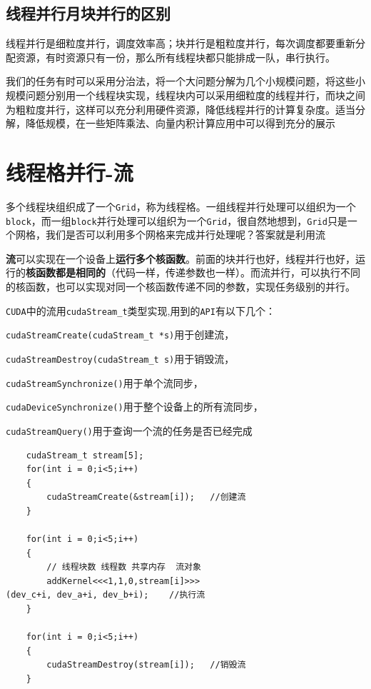 \documentclass[UTF8,a4paper,12pt]{ctexbook}
\begin{document}
		\subsection{线程并行月块并行的区别}
			线程并行是细粒度并行，调度效率高；块并行是粗粒度并行，每次调度都要重新分配资源，有时资源只有一份，那么所有线程块都只能排成一队，串行执行。 
			
			我们的任务有时可以采用分治法，将一个大问题分解为几个小规模问题，将这些小规模问题分别用一个线程块实现，线程块内可以采用细粒度的线程并行，而块之间为粗粒度并行，这样可以充分利用硬件资源，降低线程并行的计算复杂度。适当分解，降低规模，在一些矩阵乘法、向量内积计算应用中可以得到充分的展示
		  
	\section{线程格并行-流}
		多个线程块组织成了一个\verb|Grid|，称为线程格。一组线程并行处理可以组织为一个\verb|block|，而一组\verb|block|并行处理可以组织为一个\verb|Grid|，很自然地想到，\verb|Grid|只是一个网格，我们是否可以利用多个网格来完成并行处理呢？答案就是利用流
	
		\textbf{流}可以实现在一个设备上\textbf{运行多个核函数}。前面的块并行也好，线程并行也好，运行的\textbf{核函数都是相同的}（代码一样，传递参数也一样）。而流并行，可以执行不同的核函数，也可以实现对同一个核函数传递不同的参数，实现任务级别的并行。
		
		\verb|CUDA|中的流用\verb|cudaStream_t|类型实现,用到的\verb|API|有以下几个：
		
		\verb|cudaStreamCreate(cudaStream_t *s)|用于创建流，
		
		\verb|cudaStreamDestroy(cudaStream_t s)|用于销毁流，
		
		\verb|cudaStreamSynchronize()|用于单个流同步，
		
		\verb|cudaDeviceSynchronize()|用于整个设备上的所有流同步，
		
		\verb|cudaStreamQuery()|用于查询一个流的任务是否已经完成
		
			\begin{lstlisting}
	cudaStream_t stream[5];   
	for(int i = 0;i<5;i++)   
	{   
		cudaStreamCreate(&stream[i]);   //创建流   
	}  
	
	for(int i = 0;i<5;i++)   
	{   
		// 线程块数 线程数 共享内存  流对象
		addKernel<<<1,1,0,stream[i]>>>(dev_c+i, dev_a+i, dev_b+i);    //执行流   
	}    
	
	for(int i = 0;i<5;i++)   
	{   
		cudaStreamDestroy(stream[i]);   //销毁流   
	}   
			\end{lstlisting}
		
\end{document}
